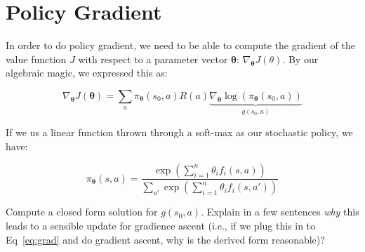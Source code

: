 \documentclass[fleqn]{hw}
\begin{document}
\section{Policy Gradient}

In order to do policy gradient, we need to be able
to compute the gradient of the value function $J$ with respect
to a parameter vector ${\mathbf \theta}$: $\nabla_{\mathbf \theta} J(\theta)$.  By
our algebraic magic, we expressed this as:

\begin{equation} \label{eq:grad}
\nabla_{\mathbf \theta} J(\mathbf \theta) 
  = \sum_a \pi_{\mathbf \theta}(s_0,a) R(a) 
             \underbrace{\nabla_{\mathbf \theta} \log \left( \pi_{\mathbf \theta}(s_0,a) \right)}_{g(s_0,a)}
\end{equation}

If we us a linear function thrown through a soft-max as our stochastic
policy, we have:

\begin{equation}
\pi_{\mathbf \theta}(s,a) 
  = \frac {\exp \left( \sum_{i=1}^n \theta_i f_i(s,a) \right)}
          {\sum_{a'} \exp \left( \sum_{i=1}^n \theta_i f_i(s,a') \right)}
\end{equation}

Compute a closed form solution for $g(s_0,a)$.  Explain in a few
sentences \emph{why} this leads to a sensible update for gradience
ascent (i.e., if we plug this in to Eq~\eqref{eq:grad} and do gradient
ascent, why is the derived form reasonable)?
\end{document}

